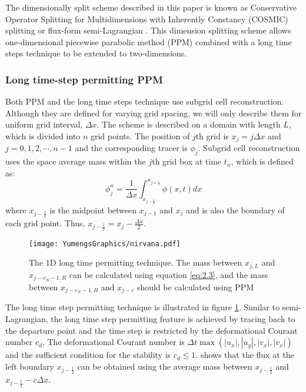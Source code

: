 The dimensionally split scheme described in this paper is known as Conservative Operator Splitting for Multidimensions with Inherently Constancy (COSMIC) splitting \citep{Leonard1996} or flux-form semi-Lagrangian \citep{Lin1996}. This dimension splitting scheme allows one-dimensional piecewise parabolic method (PPM) \citep{Colella1984} combined with a long time steps technique \citep{Leonard1995} to be extended to two-dimensions.
\subsubsection{Long time-step permitting PPM} 
\label{sec:PPM}
Both PPM and the long time steps technique use subgrid cell reconstruction. Although they are defined for varying grid spacing, we will only describe them for uniform grid interval, $\Delta x$. The scheme is described on a domain with length $L$, which is divided into $n$ grid points. The position of $j$th grid is $x_j = j\Delta x$ and $j = 0, 1, 2, \cdots, n-1$ and the corresponding tracer is $\phi_j$. Subgrid cell reconstruction uses the space average mass within the $j$th grid box at time $t_n$, which is defined as: 
\begin{equation} \label{eq:2.1} 
\phi^n_j = \frac{1}{\Delta x} \int^{x_{j+\frac{1}{2}}}_{x_{j-\frac{1}{2}}} \phi (x,t)dx
\end{equation}
where $x_{j-\frac{1}{2}}$ is the midpoint between $x_{j-1}$ and $x_{j}$ and is also the boundary of each grid point. Thus, $x_{j-\frac{1}{2}} = x_j - \frac{\Delta x}{2}$.
\begin{figure}
\centering
\texttt{[image: YumengsGraphics/nirvana.pdf]}
\caption{The 1D long time permitting technique. The mass between $x_{j,L}$ and $x_{j-c_N-1,R}$ can be calculated using equation \ref{eq:2.3}, and the mass between $x_{j-c_N-1,R}$ and $x_{j-c}$ should be calculated using PPM \label{fig:2.1}}
\end{figure}

The long time step permitting technique is illustrated in figure \ref{fig:2.1}. Similar to semi-Lagrangian, the long time step permitting feature is achieved by tracing back to the departure point and the time step is restricted by the deformational Courant number $c_d$. The deformational Courant number is $\Delta t \max(|u_x|,|u_y|,|v_x|,|v_x|)$ \citep{PS84} and the sufficient condition for the stability is $c_d \leq 1$. \cite{Leonard1995} shows that the flux at the left boundary $x_{j-\frac{1}{2}}$ can be obtained using the average mass between $x_{j-\frac{1}{2}}$ and $x_{j-\frac{1}{2}}-c\Delta x$.

